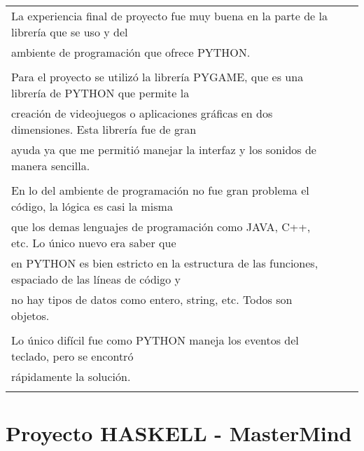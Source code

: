 \documentclass[letterpaper,11pt]{article}
\begin{document}
\begin{tabular}{lll}

La experiencia final de proyecto fue muy buena en la parte de la librer\'ia que se uso y del\\
ambiente de programaci\'on que ofrece PYTHON.\\\\
Para el proyecto se utiliz\'o la librer\'ia PYGAME, que es una librer\'ia de PYTHON que permite la\\
creaci\'on de videojuegos o aplicaciones gr\'aficas en dos dimensiones. Esta librer\'ia fue de gran\\
ayuda ya que me permiti\'o manejar la interfaz y los sonidos de manera sencilla.\\\\
En lo del ambiente de programaci\'on no fue gran problema el c\'odigo, la l\'ogica es casi la misma\\
que los demas lenguajes de programaci\'on como JAVA, C++, etc. Lo \'unico nuevo era saber que\\
en PYTHON es bien estricto en la estructura de las funciones, espaciado de las l\'ineas de c\'odigo y\\
no hay tipos de datos como entero, string, etc. Todos son objetos.\\\\
Lo \'unico dif\'icil fue como PYTHON maneja los eventos del teclado, pero se encontr\'o\\
r\'apidamente la soluci\'on.\\\\

\end{tabular}

\section{Proyecto HASKELL - MasterMind}
\end{document}
